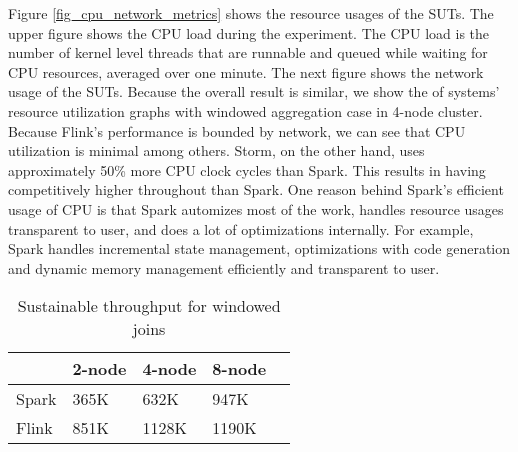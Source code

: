 Figure \ref{fig_cpu_network_metrics} shows the resource usages of the SUTs. The upper figure shows the CPU load during the experiment. The CPU load is the number of kernel level threads  that are runnable and queued while waiting for CPU resources, averaged over one minute. The next figure shows the network usage of the SUTs.  Because the overall result is similar, we show the of systems' resource utilization graphs  with windowed aggregation case in 4-node cluster.  Because Flink's performance is bounded by network, we can see that CPU utilization is minimal among others. Storm, on the other hand, uses approximately 50\% more CPU clock cycles than Spark. This results in having competitively higher throughout than Spark. One reason behind  Spark's efficient usage of CPU is that Spark automizes most of the work, handles resource usages transparent to user, and does a lot of optimizations internally. For example, Spark handles incremental state management, optimizations with code generation and dynamic memory management efficiently and transparent to user. 



    \begin{table}
        \begin{tabular}{lllll}\toprule
            &\textbf{2-node}  & \textbf{4-node} & \textbf{8-node}\\\midrule
            Spark & 365K & 632K & 947K  \\
            Flink & 851K & 1128K & 1190K \\
        \end{tabular}
        \caption{Sustainable throughput for windowed joins}
                 \label{tab_th_join}
    \end{table} 


